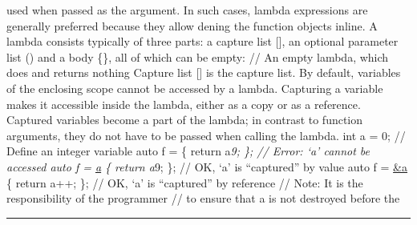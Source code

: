 used when passed as the argument. In such cases, lambda expressions are
generally preferred because they allow dening the function objects
inline. A lambda consists typically of three parts: a capture list
{[}{]}, an optional parameter list () and a body \{\}, all of which can
be empty: \href{}{} // An empty lambda, which does and returns nothing
Capture list {[}{]} is the capture list. By default, variables of the
enclosing scope cannot be accessed by a lambda. Capturing a variable
makes it accessible inside the lambda, either as a copy or as a
reference. Captured variables become a part of the lambda; in contrast
to function arguments, they do not have to be passed when calling the
lambda. int a = 0; // Define an integer variable auto f = \href{}{} \{
return a\emph{9; \}; // Error: `a' cannot be accessed auto f =
\href{}{a} \{ return a}9; \}; // OK, `a' is ``captured'' by value auto f
= \href{}{\&a} \{ return a++; \}; // OK, `a' is ``captured'' by
reference // Note: It is the responsibility of the programmer // to
ensure that a is not destroyed before the

\begin{center}\rule{0.5\linewidth}{0.5pt}\end{center}
